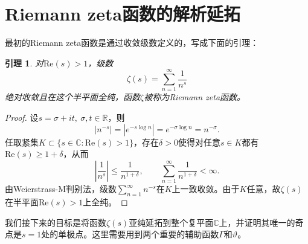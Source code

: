\documentclass[UTF8,zihao=5,linespread=1.34]{ctexart}
\theoremstyle{cnplain}
\newtheorem{lemma}[theorem]{引理}
\theoremstyle{cnremark}
\begin{document}
\newpage
\section{Riemann zeta函数的解析延拓}

最初的Riemann zeta函数是通过收敛级数定义的，写成下面的引理：

\begin{lemma}
对$\mathrm{Re}(s) > 1$，级数
\[
\zeta(s) = \sum_{n=1}^{\infty} \frac{1}{n^{s}}
\]
绝对收敛且在这个半平面全纯，函数$\zeta$被称为Riemann zeta函数。
\end{lemma}

\begin{proof}
设$s = \sigma + it,\ \sigma,t \in \mathbb{R}$，则
\[
|n^{-s}| = |e^{-s\log n}| = e^{-\sigma \log n} = n^{-\sigma}.
\]
任取紧集$K \subset \{s \in \mathbb{C}:\mathrm{Re}(s)>1\}$，存在$\delta>0$使得对任意$s\in K$都有$\mathrm{Re}(s)\geq 1+\delta$，从而
\[
\left|\frac{1}{n^s}\right|\leq \frac{1}{n^{1+\delta}},
\qquad
\sum_{n=1}^{\infty}\frac{1}{n^{1+\delta}}<\infty.
\]
由Weierstrass-M判别法，级数$\sum_{n=1}^{\infty}n^{-s}$在$K$上一致收敛。由于$K$任意，故$\zeta(s)$在半平面$\mathrm{Re}(s)>1$上全纯。
\end{proof}

我们接下来的目标是将函数$\zeta(s)$亚纯延拓到整个复平面$\mathbb{C}$上，并证明其唯一的奇点是$s=1$处的单极点。这里需要用到两个重要的辅助函数$\Gamma$和$\vartheta$。
\end{document}
